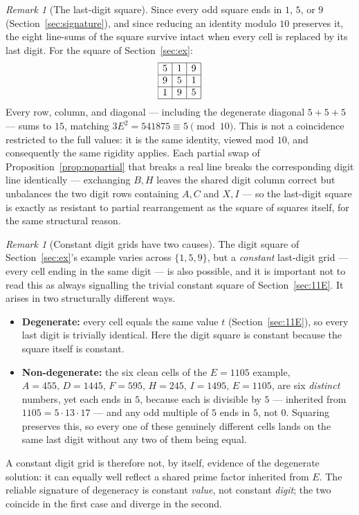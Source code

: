 \documentclass[12pt]{article}
\theoremstyle{remark}
\newtheorem{remark}[theorem]{Remark}
\begin{document}
\begin{remark}[The last-digit square]
Since every odd square ends in $1$, $5$, or $9$
(Section~\ref{sec:signature}), and since reducing an identity modulo
$10$ preserves it, the eight line-sums of the square survive intact
when every cell is replaced by its last digit. For the square of
Section~\ref{sec:ex}:
\[
\begin{array}{|c|c|c|}
\hline
5 & 1 & 9 \\ \hline
9 & 5 & 1 \\ \hline
1 & 9 & 5 \\ \hline
\end{array}
\]
Every row, column, and diagonal --- including the degenerate diagonal
$5+5+5$ --- sums to $15$, matching $3E^2=541875\equiv5\pmod{10}$. This
is not a coincidence restricted to the full values: it is the same
identity, viewed mod $10$, and consequently the same rigidity applies.
Each partial swap of Proposition~\ref{prop:nopartial} that breaks a
real line breaks the corresponding digit line identically --- exchanging
$B,H$ leaves the shared digit column correct but unbalances the two
digit rows containing $A,C$ and $X,I$ --- so the last-digit square is
exactly as resistant to partial rearrangement as the square of squares
itself, for the same structural reason.
\end{remark}

\begin{remark}[Constant digit grids have two causes]
The digit square of Section~\ref{sec:ex}'s example varies across
$\{1,5,9\}$, but a \emph{constant} last-digit grid --- every cell
ending in the same digit --- is also possible, and it is important not
to read this as always signalling the trivial constant square of
Section~\ref{sec:11E}. It arises in two structurally different ways.
\begin{itemize}
\item \textbf{Degenerate:} every cell equals the same value $t$
(Section~\ref{sec:11E}), so every last digit is trivially identical.
Here the digit square is constant because the square itself is
constant.
\item \textbf{Non-degenerate:} the six clean cells of the
$E=1105$ example, $A=455,\,D=1445,\,F=595,\,H=245,\,I=1495,\,E=1105$,
are six \emph{distinct} numbers, yet each ends in $5$, because each is
divisible by $5$ --- inherited from $1105=5\cdot13\cdot17$ --- and any
odd multiple of $5$ ends in $5$, not $0$. Squaring preserves this, so
every one of these genuinely different cells lands on the same last
digit without any two of them being equal.
\end{itemize}
A constant digit grid is therefore not, by itself, evidence of the
degenerate solution: it can equally well reflect a shared prime factor
inherited from $E$. The reliable signature of degeneracy is constant
\emph{value}, not constant \emph{digit}; the two coincide in the first
case and diverge in the second.
\end{remark}
\end{document}
